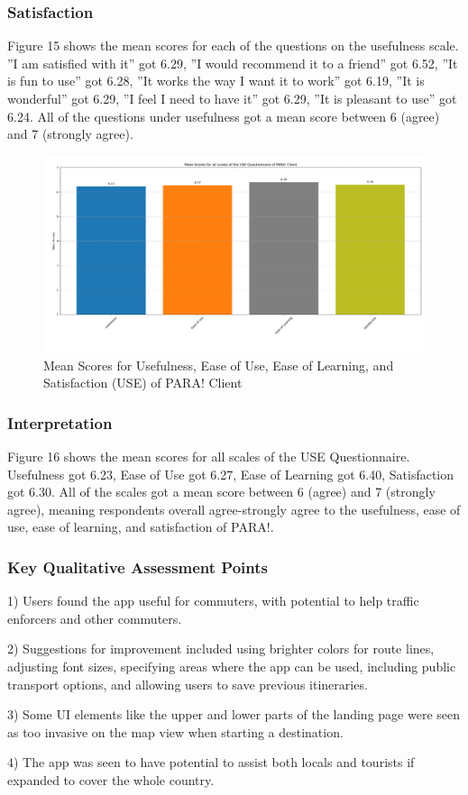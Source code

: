 \documentclass{icsthesis}
\begin{document}
\begin{mainmatter}
		\subsubsection{Satisfaction}
		Figure 15 shows the mean scores for each of the questions on the usefulness scale. ”I am satisfied with it” got 6.29, ”I would recommend it to a friend” got 6.52, ”It is fun to use” got 6.28, ”It works the way I want it to work” got 6.19, ”It is wonderful” got 6.29, ”I feel I need to have it” got 6.29, ”It is pleasant to use” got 6.24.
		All of the questions under usefulness got a mean score between 6 (agree) and 7 (strongly agree).
		\begin{figure}[h]
			\centering
				\includegraphics[scale=0.18]{./figures/client means total.png}
			\caption{Mean Scores for Usefulness, Ease of Use, Ease of Learning, and Satisfaction (USE) of PARA! Client}
		\end{figure}
		\subsubsection{Interpretation}
		Figure 16 shows the mean scores for all scales of the USE Questionnaire. Usefulness got 6.23, Ease of Use got 6.27, Ease of Learning got 6.40, Satisfaction got 6.30.
		All of the scales got a mean score between 6 (agree) and 7 (strongly agree), meaning respondents overall agree-strongly agree to the usefulness, ease of use, ease of learning, and satisfaction of PARA!.
		\subsubsection{Key Qualitative Assessment Points}
		\begin{description}
			\item 1) Users found the app useful for commuters, with potential to help traffic enforcers and other commuters.
			\item 2) Suggestions for improvement included using brighter colors for route lines, adjusting font sizes, specifying areas where the app can be used, including public transport options, and allowing users to save previous itineraries.
			\item 3) Some UI elements like the upper and lower parts of the landing page were seen as too invasive on the map view when starting a destination.
			\item 4) The app was seen to have potential to assist both locals and tourists if expanded to cover the whole country.
		\end{description}
		

\end{mainmatter}
\end{document}
